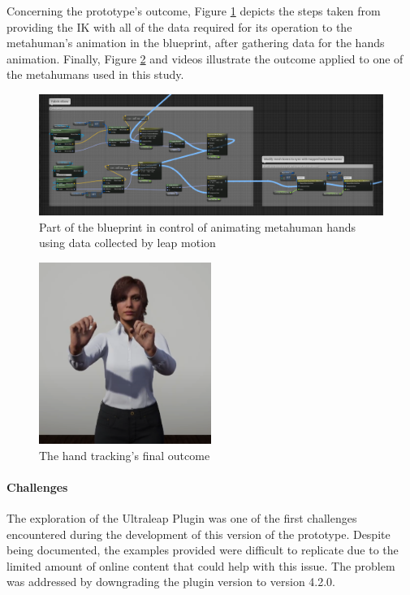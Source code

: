 Concerning the prototype's outcome, Figure \ref{fig:BPHandsAndIK} depicts the steps taken from providing the IK with all of the data required for its operation to the metahuman's animation in the blueprint, after gathering data for the hands animation. Finally, Figure \ref{fig:handTrack} and videos \cite{APT1,APT2} illustrate the outcome applied to one of the metahumans used in this study.

\begin{figure}[!htb]
\includegraphics[width=\textwidth]{figures/BPHandsAndIK.png}
\centering
\caption{Part of the blueprint in control of animating metahuman hands using data collected by leap motion}
\label{fig:BPHandsAndIK}
\end{figure}

\begin{figure}[!htb]
\includegraphics[width=0.5\textwidth]{figures/final.png}
\centering
\caption{The hand tracking's final outcome}
\label{fig:handTrack}
\end{figure}

\paragraph{Challenges}
The exploration of the Ultraleap Plugin was one of the first challenges encountered during the development of this version of the prototype. Despite being documented, the examples provided were difficult to replicate due to the limited amount of online content that could help with this issue. The problem was addressed by downgrading the plugin version to version 4.2.0. 


